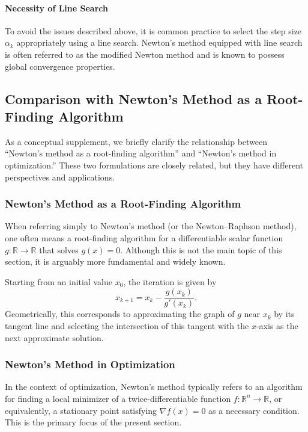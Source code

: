 \documentclass[en]{subfiles}
\begin{document}
\paragraph{Necessity of Line Search}

To avoid the issues described above, it is common practice to select the step size $\alpha_k$ appropriately using a line search.
Newton's method equipped with line search is often referred to as the modified Newton method and is known to possess global convergence properties.

\subsection{Comparison with Newton's Method as a Root-Finding Algorithm}

As a conceptual supplement, we briefly clarify the relationship between ``Newton's method as a root-finding algorithm'' and ``Newton's method in optimization.''
These two formulations are closely related, but they have different perspectives and applications.

\subsubsection{Newton's Method as a Root-Finding Algorithm}

When referring simply to Newton's method (or the Newton--Raphson method), one often means a root-finding algorithm for a differentiable scalar function $g\colon \mathbb{R} \to \mathbb{R}$ that solves $g(x) = 0$.
Although this is not the main topic of this section, it is arguably more fundamental and widely known.

Starting from an initial value $x_0$, the iteration is given by
\begin{equation*}
    x_{k+1} = x_k - \frac{g(x_k)}{g'(x_k)}.
\end{equation*}
Geometrically, this corresponds to approximating the graph of $g$ near $x_k$ by its tangent line and selecting the intersection of this tangent with the $x$-axis as the next approximate solution.

\subsubsection{Newton's Method in Optimization}

In the context of optimization, Newton's method typically refers to an algorithm for finding a local minimizer of a twice-differentiable function $f\colon \mathbb R^{n} \to\mathbb{R}$, or equivalently, a stationary point satisfying $\nabla f(x) = 0$ as a necessary condition.
This is the primary focus of the present section.
\end{document}
